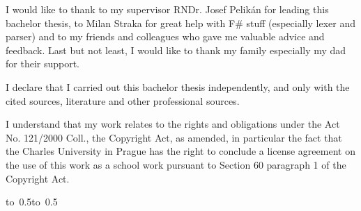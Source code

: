 
\noindent
I would like to thank to my supervisor RNDr. Josef Pelikán for leading this bachelor thesis,
	to Milan Straka for great help with F\# stuff (especially lexer and parser)
	and to my friends and colleagues who gave me valuable advice and feedback.
Last but not least, I would like to thank my family especially my dad for their support.


\vfill

\noindent
I declare that I carried out this bachelor thesis independently, and only with the cited
sources, literature and other professional sources.

\medskip\noindent
I understand that my work relates to the rights and obligations under the Act No.
121/2000 Coll., the Copyright Act, as amended, in particular the fact that the Charles
University in Prague has the right to conclude a license agreement on the use of this
work as a school work pursuant to Section 60 paragraph 1 of the Copyright Act.

\vspace{10mm}

\hbox{\hbox to 0.5\hbox to 0.5}

\vspace{20mm}











































